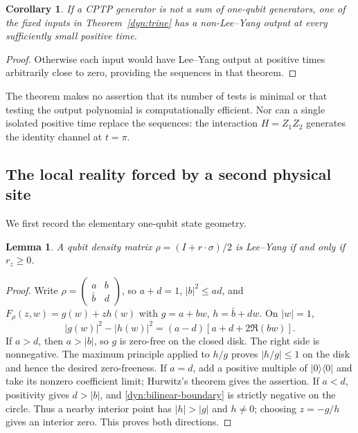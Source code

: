 \documentclass[reqno]{amsart}
\newtheorem{lemma}[theorem]{Lemma}
\newtheorem{corollary}[theorem]{Corollary}
\theoremstyle{definition}
\theoremstyle{remark}
\begin{document}
\begin{corollary}\label{dyn:immediate-failure}
If a CPTP generator is not a sum of one-qubit generators, one of the fixed
inputs in Theorem~\ref{dyn:trine} has a non-Lee--Yang output at every
sufficiently small positive time.
\end{corollary}

\begin{proof}
Otherwise each input would have Lee--Yang output at positive times
arbitrarily close to zero, providing the sequences in that theorem.
\end{proof}

The theorem makes no assertion that its number of tests is minimal or that
testing the output polynomial is computationally efficient.  Nor can a
single isolated positive time replace the sequences: the interaction
$H=Z_1Z_2$ generates the identity channel at $t=\pi$.

\subsection{The local reality forced by a second physical site}

We first record the elementary one-qubit state geometry.

\begin{lemma}\label{dyn:hemisphere}
A qubit density matrix $\rho=(I+r\cdot\sigma)/2$ is Lee--Yang if and only
if $r_z\ge0$.
\end{lemma}

\begin{proof}
Write $\rho=\left(\begin{smallmatrix}a&b\\\bar b&d\end{smallmatrix}\right)$,
so $a+d=1$, $|b|^2\le ad$, and
$F_\rho(z,w)=g(w)+z h(w)$ with $g=a+bw$, $h=\bar b+dw$.
On $|w|=1$,
\begin{equation}\label{dyn:bilinear-boundary}
 |g(w)|^2-|h(w)|^2
 =(a-d)[a+d+2\Re(bw)].
\end{equation}
If $a>d$, then $a>|b|$, so $g$ is zero-free on the closed disk.
The right side is nonnegative.  The maximum principle applied to $h/g$
proves $|h/g|\le1$ on the disk and hence the desired zero-freeness.
If $a=d$, add a positive multiple of $|0\rangle\langle0|$ and take its
nonzero coefficient limit; Hurwitz's theorem gives the assertion.
If $a<d$, positivity gives $d>|b|$, and
\eqref{dyn:bilinear-boundary} is strictly negative on the circle.
Thus a nearby interior point has $|h|>|g|$ and $h\ne0$;
choosing $z=-g/h$ gives an interior zero.  This proves both directions.
\end{proof}
\end{document}
